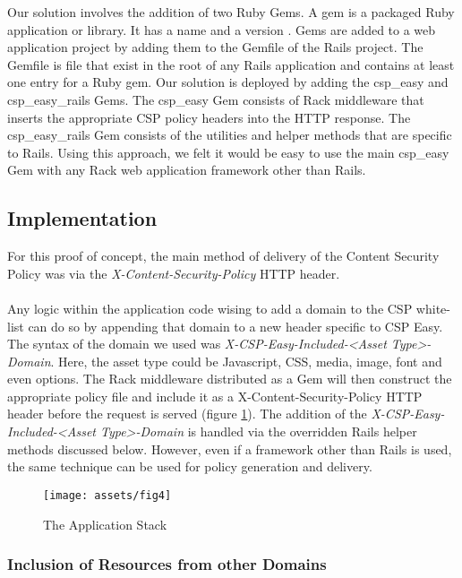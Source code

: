 \documentclass[10pt, conference, compsocconf]{IEEEtran}
\begin{document}
Our solution involves the addition of two Ruby Gems. A gem is a packaged Ruby application or library. It has a name and a version \cite{IEEEhowto:rorgem}. Gems are added to a web application project by adding them to the Gemfile of the Rails project. The Gemfile is file that exist in the root of any Rails application and contains at least one entry for a Ruby gem. Our solution is deployed by adding the csp\_easy and csp\_easy\_rails Gems. The csp\_easy Gem consists of Rack middleware that inserts the appropriate CSP policy headers into the HTTP response. The csp\_easy\_rails Gem consists of the utilities and helper methods that are specific to Rails. Using this approach, we felt it would be easy to use the main csp\_easy Gem with any Rack web application framework other than Rails.

\subsection{Implementation} %
\label{sub:implementation}
For this proof of concept, the main method of delivery of the Content Security Policy was via the \emph{X-Content-Security-Policy} HTTP header.
\\\\
Any logic within the application code wising to add a domain to the CSP white-list can do so by appending that domain to a new header specific to CSP Easy. The syntax of the domain we used was \emph{X-CSP-Easy-Included-<Asset Type>-Domain}. Here, the asset type could be Javascript, CSS, media, image, font and even options. The Rack middleware distributed as a Gem will then construct the appropriate policy file and include it as a X-Content-Security-Policy HTTP header before the request is served (figure \ref{fig:app_stack}). The addition of the \emph{X-CSP-Easy-Included-<Asset Type>-Domain} is handled via the overridden Rails helper methods discussed below. However, even if a framework other than Rails is used, the same technique can be used for policy generation and delivery.

\begin{figure}[hb]
 \caption{The Application Stack}
 \label{fig:app_stack}
 \centering
 \texttt{[image: assets/fig4]}
\end{figure}

\subsubsection{Inclusion of Resources from other Domains} %
\label{ssub:inclusion_of_resources_from_other_domains}
\end{document}
